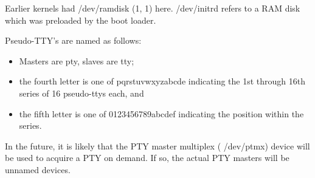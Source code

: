 \noindent
Earlier kernels had {\file /dev/ramdisk} (1, 1) here.  {\file /dev/initrd}
refers to a RAM disk which was preloaded by the boot loader.

\begin{devicelist}
	\minordots
\end{devicelist}

\noindent
Pseudo-TTY's are named as follows:
\begin{itemize}
\item Masters are {\file pty}, slaves are {\file tty};
\item the fourth letter is one of {\file pqrstuvwxyzabcde} indicating
the 1st through 16th series of 16 pseudo-ttys each, and
\item the fifth letter is one of {\file 0123456789abcdef} indicating
the position within the series.
\end{itemize}

\noindent
In the future, it is likely that the PTY master multiplex ({\file
/dev/ptmx}) device will be used to acquire a PTY on demand.  If so,
the actual PTY masters will be unnamed devices.

